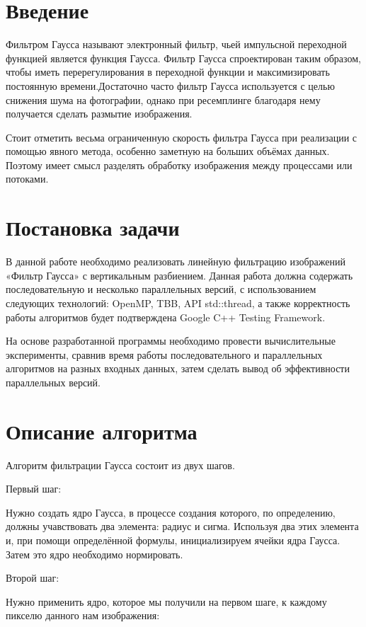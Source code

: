 \documentclass{report}
\begin{document}
\setcounter{page}{2}

\section*{Введение}
Фильтром Гаусса называют электронный фильтр, чьей импульсной переходной функцией является функция Гаусса. Фильтр Гаусса спроектирован таким образом, чтобы иметь перерегулирования в переходной функции и максимизировать постоянную времени.Достаточно часто фильтр Гаусса используется с целью снижения шума на фотографии, однако при ресемплинге благодаря нему получается сделать размытие изображения.
\par
Стоит отметить весьма ограниченную скорость фильтра Гаусса при реализации с помощью явного метода, особенно заметную на больших объёмах данных. Поэтому имеет смысл разделять обработку изображения между процессами или потоками.
\newpage

\section*{Постановка задачи}
В данной работе необходимо реализовать линейную фильтрацию изображений\newline
«Фильтр Гаусса» с вертикальным разбиением. Данная работа должна содержать последовательную и несколько параллельных версий, с использованием следующих технологий: OpenMP, TBB, API std::thread, а также корректность работы алгоритмов будет подтверждена Google C++ Testing Framework.
\par
На основе разработанной программы необходимо провести вычислительные эксперименты, сравнив время работы последовательного и параллельных алгоритмов на разных входных данных, затем сделать вывод об эффективности параллельных версий.

\newpage

\section*{Описание алгоритма}
Алгоритм фильтрации Гаусса состоит из двух шагов.
\par
Первый шаг:
\par
Нужно создать ядро Гаусса, в процессе создания которого, по определению, должны учавствовать два элемента: радиус и сигма. Используя два этих элемента и, при помощи определённой формулы, инициализируем ячейки ядра Гаусса. Затем это ядро необходимо нормировать.
\par
Второй шаг:
\par
Нужно применить ядро, которое мы получили на первом шаге, к каждому пикселю данного нам изображения:
\end{document}
